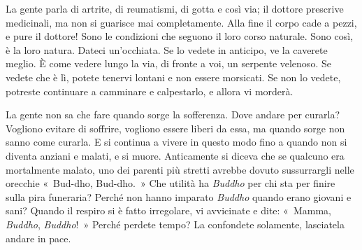 La gente parla di artrite, di reumatismi, di gotta e così via; il
dottore prescrive medicinali, ma non si guarisce mai completamente. Alla
fine il corpo cade a pezzi, e pure il dottore! Sono le condizioni che
seguono il loro corso naturale. Sono così, è la loro natura. Dateci
un'occhiata. Se lo vedete in anticipo, ve la caverete meglio. È come
vedere lungo la via, di fronte a voi, un serpente velenoso. Se vedete
che è lì, potete tenervi lontani e non essere morsicati. Se non lo
vedete, potreste continuare a camminare e calpestarlo, e allora vi
morderà.

La gente non sa che fare quando sorge la sofferenza. Dove andare per
curarla? Vogliono evitare di soffrire, vogliono essere liberi da essa,
ma quando sorge non sanno come curarla. E si continua a vivere in questo
modo fino a quando non si diventa anziani e malati, e si muore.
Anticamente si diceva che se qualcuno era mortalmente malato, uno dei
parenti più stretti avrebbe dovuto sussurrargli nelle orecchie
«~Bud-dho, Bud-dho.~» Che utilità ha \emph{Buddho} per chi sta per
finire sulla pira funeraria? Perché non hanno imparato \emph{Buddho}
quando erano giovani e sani? Quando il respiro si è fatto irregolare, vi
avvicinate e dite: «~Mamma, \emph{Buddho}, \emph{Buddho}!~» Perché
perdete tempo? La confondete solamente, lasciatela andare in pace.

